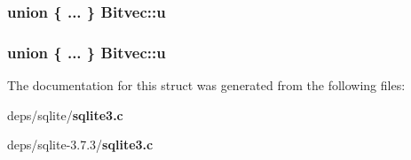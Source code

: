 \subsubsection{\setlength{\rightskip}{0pt plus 5cm}union \{ ... \}   \bf{Bitvec::u}}\label{structBitvec_472be4727aeeec38d18e38743136b10a}


\subsubsection{\setlength{\rightskip}{0pt plus 5cm}union \{ ... \}   \bf{Bitvec::u}}\label{structBitvec_5785791d75e76df0e5a76aa21a665566}




The documentation for this struct was generated from the following files:\begin{CompactItemize}
\item 
deps/sqlite/\bf{sqlite3.c}\item 
deps/sqlite-3.7.3/\bf{sqlite3.c}\end{CompactItemize}

